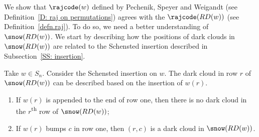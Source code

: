 We show
that $\rajcode(w)$ defined by Pechenik, Speyer and Weigandt
(see Definition~\ref{D: raj on permutations})
agrees with the $\rajcode(RD(w))$ (see Definition~\ref{defn.raj}). 
To do so, 
we need a better understanding of $\snow(RD(w))$. 
We start by describing how the positions of dark clouds in $\snow(RD(w))$ 
are related to the Schensted insertion described in Subsection~\ref{SS: insertion}.

\begin{prop}\label{prop: rsk and dark clouds}
Take $w \in S_n$.
Consider the Schensted insertion on $w$.
The dark cloud in row $r$ of $\snow(RD(w))$ can be described 
based on the insertion of $w(r)$.
\begin{enumerate}
\item If $w(r)$ is appended to the end of row one, 
then there is no dark cloud in the $r$\textsuperscript{th} row of $\snow(RD(w))$;
\item If $w(r)$ bumps $c$ in row one, 
then $(r, c)$ is a dark cloud in $\snow(RD(w))$.
\end{enumerate}
\end{prop}

